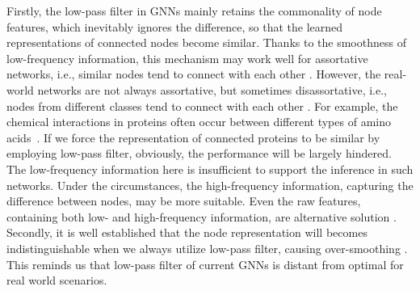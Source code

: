 \documentclass[letterpaper]{article} %
\begin{document}
Firstly, the low-pass filter in GNNs mainly retains the commonality of node features, which inevitably ignores the difference, so that the learned representations of connected nodes become similar. Thanks to the smoothness of low-frequency information, this mechanism may work well for assortative networks, i.e., similar nodes tend to connect with each other \cite{GraphHeat}. 
However, the real-world networks are not always assortative, but sometimes disassortative, i.e., nodes from different classes tend to connect with each other \cite{mixing}. 
For example, the chemical interactions in proteins often occur between different types of amino acids~\cite{H2GNN}.
If we force the representation of connected proteins to be similar by employing low-pass filter, obviously, the performance will be largely hindered. The low-frequency information here is insufficient to support the inference in such networks. Under the circumstances, the high-frequency information, capturing the difference between nodes, may be more suitable. Even the raw features, containing both low- and high-frequency information, are alternative solution \cite{AM-GCN}. Secondly, it is well established that the node representation will becomes indistinguishable when we always utilize low-pass filter, causing over-smoothing \cite{lossexp}. This reminds us that low-pass filter of current GNNs is distant from optimal for real world scenarios.
\end{document}
